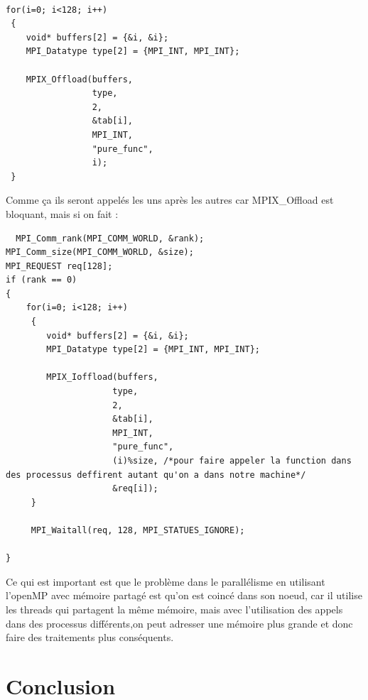 \documentclass[12pt,titlepage]{article}
\begin{document}
\begin{lstlisting}
  
for(i=0; i<128; i++)
 {
 	void* buffers[2] = {&i, &i};
 	MPI_Datatype type[2] = {MPI_INT, MPI_INT};

 	MPIX_Offload(buffers,
 				 type,
 				 2,
 				 &tab[i],
 				 MPI_INT,
 				 "pure_func",
 				 i);
 }
 \end{lstlisting}
Comme ça ils seront appelés les uns après les autres car MPIX\_Offload est bloquant, mais si on fait :
\begin{lstlisting}
  MPI_Comm_rank(MPI_COMM_WORLD, &rank);
MPI_Comm_size(MPI_COMM_WORLD, &size);
MPI_REQUEST req[128];
if (rank == 0)
{
	for(i=0; i<128; i++)
	 {
	 	void* buffers[2] = {&i, &i};
	 	MPI_Datatype type[2] = {MPI_INT, MPI_INT};

	 	MPIX_Ioffload(buffers,
	 				 type,
	 				 2,
	 				 &tab[i],
	 				 MPI_INT,
	 				 "pure_func",
	 				 (i)%size, /*pour faire appeler la function dans des processus deffirent autant qu'on a dans notre machine*/
	 				 &req[i]);
	 }

	 MPI_Waitall(req, 128, MPI_STATUES_IGNORE);

}
\end{lstlisting}

Ce qui est important est que le problème dans le parallélisme en utilisant l'openMP avec mémoire partagé est qu'on est coincé dans son noeud, car il utilise les threads qui partagent la même mémoire, mais avec l'utilisation des appels dans des processus différents,on peut adresser une mémoire plus grande et donc faire des traitements plus conséquents.


\pagebreak

\section{Conclusion}



\pagebreak 

\nocite{*} 



\end{document}
